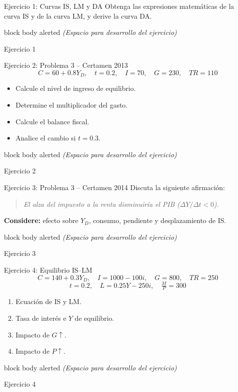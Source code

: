 \documentclass[aspectratio=169]{beamer}
\newcommand{\espaciodesarrollo}{
\vspace{0.6cm}
\begin{beamercolorbox}[wd=\textwidth,rounded=true,shadow=false,sep=8pt,center]{block body alerted}
\vspace{1.8cm}
\textit{(Espacio para desarrollo del ejercicio)}
\vspace{1.8cm}
\end{beamercolorbox}
}
\begin{document}

\begin{frame}{Ejercicio 1: Curvas IS, LM y DA}
Obtenga las expresiones matemáticas de la curva IS y de la curva LM, y derive la curva DA.
\espaciodesarrollo
\end{frame}

\begin{frame}{Ejercicio 1}
    
\end{frame}

\begin{frame}{Ejercicio 2: Problema 3 – Certamen 2013}
\[
C = 60 + 0.8Y_D, \quad t = 0.2, \quad I = 70, \quad G = 230, \quad TR = 110
\]
\begin{itemize}
  \item Calcule el nivel de ingreso de equilibrio.
  \item Determine el multiplicador del gasto.
  \item Calcule el balance fiscal.
  \item Analice el cambio si \(t = 0.3\).
\end{itemize}
\espaciodesarrollo
\end{frame}
\begin{frame}{Ejercicio 2}
    
\end{frame}


\begin{frame}{Ejercicio 3: Problema 3 – Certamen 2014}
Discuta la siguiente afirmación:
\begin{quote}
\textit{El alza del impuesto a la renta disminuiría el PIB (\(\Delta Y / \Delta t < 0\)).}
\end{quote}
\textbf{Considere:} efecto sobre \(Y_D\), consumo, pendiente y desplazamiento de IS.
\espaciodesarrollo
\end{frame}

\begin{frame}{Ejercicio 3}
    
\end{frame}

\begin{frame}{Ejercicio 4: Equilibrio IS–LM}
\[
C = 140 + 0.3Y_D,\quad I = 1000 - 100i,\quad G = 800,\quad TR = 250
\]
\[
t = 0.2,\quad L = 0.25Y - 250i,\quad \tfrac{M}{P}=300
\]
\begin{enumerate}[label=\alph*)]
  \item Ecuación de IS y LM.  
  \item Tasa de interés e \(Y\) de equilibrio.  
  \item Impacto de \(G \uparrow\).  
  \item Impacto de \(P \uparrow\).  
\end{enumerate}
\espaciodesarrollo
\end{frame}
\begin{frame}{Ejercicio 4}
    
\end{frame}
\end{document}
